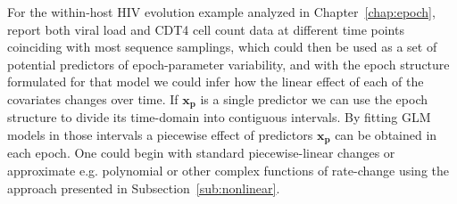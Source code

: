 For the within-host HIV evolution example analyzed in Chapter~\ref{chap:epoch}, \citet{Shankarappa1999} report both viral load and CDT4 cell count data at different time points coinciding with most sequence samplings, which could then be used as a set of potential predictors of epoch-parameter variability, and with the epoch structure %
formulated 
for that model we could infer how the linear effect of each of the covariates changes over time.
If $\mathbf{x_{p}}$ is a single predictor we can use the epoch structure to divide its time-domain into contiguous intervals.
By fitting GLM models in those intervals a piecewise effect of predictors $\mathbf{x_{p}}$ can be obtained in each epoch. 
One could begin with standard piecewise-linear changes or approximate e.g. polynomial or other complex functions of rate-change using the approach presented in Subsection~\ref{sub:nonlinear}.



